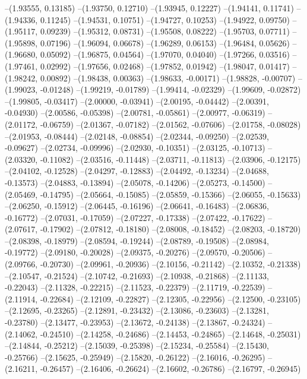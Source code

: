 --(1.93555, 0.13185)
--(1.93750, 0.12710)
--(1.93945, 0.12227)
--(1.94141, 0.11741)
--(1.94336, 0.11245)
--(1.94531, 0.10751)
--(1.94727, 0.10253)
--(1.94922, 0.09750)
--(1.95117, 0.09239)
--(1.95312, 0.08731)
--(1.95508, 0.08222)
--(1.95703, 0.07711)
--(1.95898, 0.07196)
--(1.96094, 0.06678)
--(1.96289, 0.06153)
--(1.96484, 0.05626)
--(1.96680, 0.05092)
--(1.96875, 0.04564)
--(1.97070, 0.04040)
--(1.97266, 0.03516)
--(1.97461, 0.02992)
--(1.97656, 0.02468)
--(1.97852, 0.01942)
--(1.98047, 0.01417)
--(1.98242, 0.00892)
--(1.98438, 0.00363)
--(1.98633, -0.00171)
--(1.98828, -0.00707)
--(1.99023, -0.01248)
--(1.99219, -0.01789)
--(1.99414, -0.02329)
--(1.99609, -0.02872)
--(1.99805, -0.03417)
--(2.00000, -0.03941)
--(2.00195, -0.04442)
--(2.00391, -0.04930)
--(2.00586, -0.05398)
--(2.00781, -0.05861)
--(2.00977, -0.06319)
--(2.01172, -0.06759)
--(2.01367, -0.07182)
--(2.01562, -0.07606)
--(2.01758, -0.08028)
--(2.01953, -0.08444)
--(2.02148, -0.08854)
--(2.02344, -0.09250)
--(2.02539, -0.09627)
--(2.02734, -0.09996)
--(2.02930, -0.10351)
--(2.03125, -0.10713)
--(2.03320, -0.11082)
--(2.03516, -0.11448)
--(2.03711, -0.11813)
--(2.03906, -0.12175)
--(2.04102, -0.12528)
--(2.04297, -0.12883)
--(2.04492, -0.13234)
--(2.04688, -0.13573)
--(2.04883, -0.13894)
--(2.05078, -0.14206)
--(2.05273, -0.14500)
--(2.05469, -0.14795)
--(2.05664, -0.15085)
--(2.05859, -0.15366)
--(2.06055, -0.15633)
--(2.06250, -0.15912)
--(2.06445, -0.16196)
--(2.06641, -0.16483)
--(2.06836, -0.16772)
--(2.07031, -0.17059)
--(2.07227, -0.17338)
--(2.07422, -0.17622)
--(2.07617, -0.17902)
--(2.07812, -0.18180)
--(2.08008, -0.18452)
--(2.08203, -0.18720)
--(2.08398, -0.18979)
--(2.08594, -0.19244)
--(2.08789, -0.19508)
--(2.08984, -0.19772)
--(2.09180, -0.20028)
--(2.09375, -0.20276)
--(2.09570, -0.20506)
--(2.09766, -0.20730)
--(2.09961, -0.20936)
--(2.10156, -0.21142)
--(2.10352, -0.21338)
--(2.10547, -0.21524)
--(2.10742, -0.21693)
--(2.10938, -0.21868)
--(2.11133, -0.22043)
--(2.11328, -0.22215)
--(2.11523, -0.22379)
--(2.11719, -0.22539)
--(2.11914, -0.22684)
--(2.12109, -0.22827)
--(2.12305, -0.22956)
--(2.12500, -0.23105)
--(2.12695, -0.23265)
--(2.12891, -0.23432)
--(2.13086, -0.23603)
--(2.13281, -0.23780)
--(2.13477, -0.23953)
--(2.13672, -0.24138)
--(2.13867, -0.24324)
--(2.14062, -0.24510)
--(2.14258, -0.24686)
--(2.14453, -0.24865)
--(2.14648, -0.25031)
--(2.14844, -0.25212)
--(2.15039, -0.25398)
--(2.15234, -0.25584)
--(2.15430, -0.25766)
--(2.15625, -0.25949)
--(2.15820, -0.26122)
--(2.16016, -0.26295)
--(2.16211, -0.26457)
--(2.16406, -0.26624)
--(2.16602, -0.26786)
--(2.16797, -0.26945)
